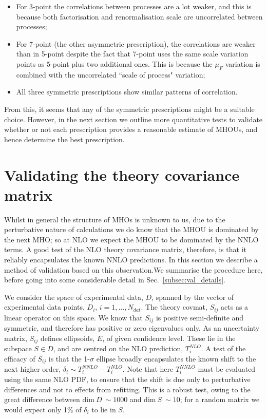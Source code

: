 \begin{itemize}
\item For 3-point the correlations between processes are a lot weaker, and this is because both factorisation and renormalisation scale are uncorrelated between processes;
\item For 7-point (the other asymmetric prescription), the correlations are weaker than in 5-point despite the fact that 7-point uses the same scale variation points as 5-point plus two additional ones. This is because the $\mu_F$ variation is combined with the uncorrelated ``scale of process" variation;
\item All three symmetric prescriptions show similar patterns of correlation.
\end{itemize}
From this, it seems that any of the symmetric prescriptions might be a suitable choice. However, in the next section we outline more quantitative tests to validate whether or not each prescription provides a reasonable estimate of MHOUs, and hence determine the best prescription. 

\section{Validating the theory covariance matrix}
\label{sec:valid}
Whilst in general the structure of MHOs is unknown to us, due to the perturbative nature of calculations we do know that the MHOU is dominated by the next MHO; so at NLO we expect the MHOU to be dominated by the NNLO terms. A good test of the NLO theory covariance matrix, therefore, is that it reliably encapsulates the known NNLO predictions. In this section we describe a method of validation based on this observation.We summarise the procedure here, before going into some considerable detail in Sec.~\ref{subsec:val_details}. 

We consider the space of experimental data, $D$, spanned by the vector of experimental data points, $D_i$, $i=1,\dots, N_{dat}$. The theory covmat, $S_{ij}$ acts as a linear operator on this space. We know that $S_{ij}$ is positive semi-definite and symmetric, and therefore has positive or zero eigenvalues only. As an uncertainty matrix, $S_{ij}$ defines ellipsoids, $E$, of given confidence level. These lie in the subspace $S \in D$, and are centred on the NLO prediction, $T_i^{NLO}$. A test of the efficacy of $S_{ij}$ is that the 1-$\sigma$ ellipse broadly encapsulates the known shift to the next higher order, $\delta_i \sim T_i^{NNLO} - T_i^{NLO}$. Note that here $T_i^{NNLO}$ must be evaluated using the same NLO PDF, to ensure that the shift is due only to perturbative differences and not to effects from refitting. This is a robust test, owing to the great difference between $\text{dim}\ D\ \sim 1000$ and $\text{dim}\ S\ \sim 10$; for a random matrix we would expect only 1\% of $\delta_i$ to lie in $S$. 

